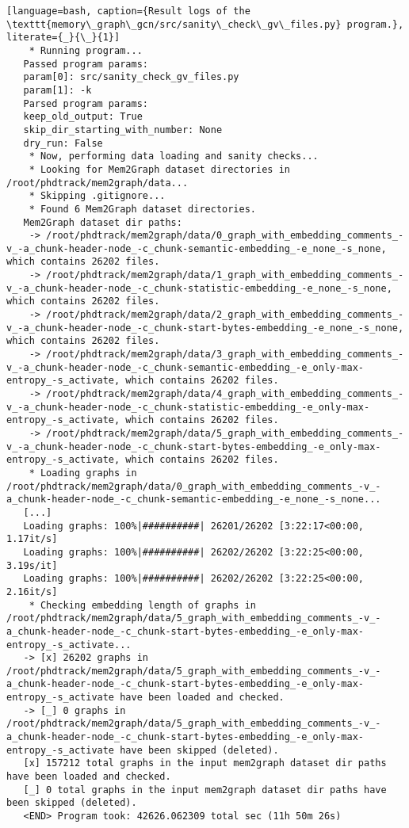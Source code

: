 \begin{lstlisting}[language=bash, caption={Result logs of the \texttt{memory\_graph\_gcn/src/sanity\_check\_gv\_files.py} program.}, literate={_}{\_}{1}]
    * Running program...
   Passed program params:
   param[0]: src/sanity_check_gv_files.py
   param[1]: -k
   Parsed program params:
   keep_old_output: True
   skip_dir_starting_with_number: None
   dry_run: False
    * Now, performing data loading and sanity checks...
    * Looking for Mem2Graph dataset directories in /root/phdtrack/mem2graph/data...
    * Skipping .gitignore...
    * Found 6 Mem2Graph dataset directories.
   Mem2Graph dataset dir paths:
    -> /root/phdtrack/mem2graph/data/0_graph_with_embedding_comments_-v_-a_chunk-header-node_-c_chunk-semantic-embedding_-e_none_-s_none, which contains 26202 files.
    -> /root/phdtrack/mem2graph/data/1_graph_with_embedding_comments_-v_-a_chunk-header-node_-c_chunk-statistic-embedding_-e_none_-s_none, which contains 26202 files.
    -> /root/phdtrack/mem2graph/data/2_graph_with_embedding_comments_-v_-a_chunk-header-node_-c_chunk-start-bytes-embedding_-e_none_-s_none, which contains 26202 files.
    -> /root/phdtrack/mem2graph/data/3_graph_with_embedding_comments_-v_-a_chunk-header-node_-c_chunk-semantic-embedding_-e_only-max-entropy_-s_activate, which contains 26202 files.
    -> /root/phdtrack/mem2graph/data/4_graph_with_embedding_comments_-v_-a_chunk-header-node_-c_chunk-statistic-embedding_-e_only-max-entropy_-s_activate, which contains 26202 files.
    -> /root/phdtrack/mem2graph/data/5_graph_with_embedding_comments_-v_-a_chunk-header-node_-c_chunk-start-bytes-embedding_-e_only-max-entropy_-s_activate, which contains 26202 files.
    * Loading graphs in /root/phdtrack/mem2graph/data/0_graph_with_embedding_comments_-v_-a_chunk-header-node_-c_chunk-semantic-embedding_-e_none_-s_none...
   [...]
   Loading graphs: 100%|##########| 26201/26202 [3:22:17<00:00,  1.17it/s]
   Loading graphs: 100%|##########| 26202/26202 [3:22:25<00:00,  3.19s/it]
   Loading graphs: 100%|##########| 26202/26202 [3:22:25<00:00,  2.16it/s]
    * Checking embedding length of graphs in /root/phdtrack/mem2graph/data/5_graph_with_embedding_comments_-v_-a_chunk-header-node_-c_chunk-start-bytes-embedding_-e_only-max-entropy_-s_activate...
   -> [x] 26202 graphs in /root/phdtrack/mem2graph/data/5_graph_with_embedding_comments_-v_-a_chunk-header-node_-c_chunk-start-bytes-embedding_-e_only-max-entropy_-s_activate have been loaded and checked.
   -> [_] 0 graphs in /root/phdtrack/mem2graph/data/5_graph_with_embedding_comments_-v_-a_chunk-header-node_-c_chunk-start-bytes-embedding_-e_only-max-entropy_-s_activate have been skipped (deleted).
   [x] 157212 total graphs in the input mem2graph dataset dir paths have been loaded and checked.
   [_] 0 total graphs in the input mem2graph dataset dir paths have been skipped (deleted).
   <END> Program took: 42626.062309 total sec (11h 50m 26s)
\end{lstlisting}

